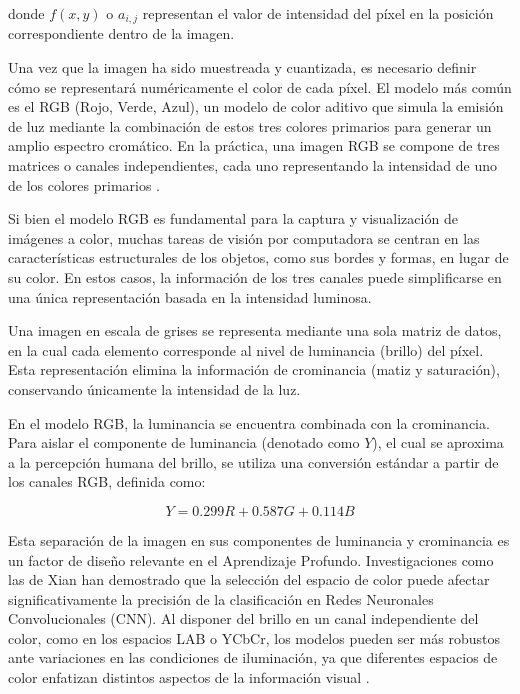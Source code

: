 	donde $f(x,y)$ o $a_{i,j}$ representan el valor de intensidad del píxel en la posición correspondiente dentro de la imagen.
	
	Una vez que la imagen ha sido muestreada y cuantizada, es necesario definir cómo se representará numéricamente el color de cada píxel. El modelo más común es el RGB (Rojo, Verde, Azul), un modelo de color aditivo que simula la emisión de luz mediante la combinación de estos tres colores primarios para generar un amplio espectro cromático. En la práctica, una imagen RGB se compone de tres matrices o canales independientes, cada uno representando la intensidad de uno de los colores primarios \cite{xian2025}.
	
	Si bien el modelo RGB es fundamental para la captura y visualización de imágenes a color, muchas tareas de visión por computadora se centran en las características estructurales de los objetos, como sus bordes y formas, en lugar de su color. En estos casos, la información de los tres canales puede simplificarse en una única representación basada en la intensidad luminosa.
	
	Una imagen en escala de grises se representa mediante una sola matriz de datos, en la cual cada elemento corresponde al nivel de luminancia (brillo) del píxel. Esta representación elimina la información de crominancia (matiz y saturación), conservando únicamente la intensidad de la luz.
	
	En el modelo RGB, la luminancia se encuentra combinada con la crominancia. Para aislar el componente de luminancia (denotado como $Y$), el cual se aproxima a la percepción humana del brillo, se utiliza una conversión estándar a partir de los canales RGB, definida como:
	
	\begin{equation*}
		Y = 0.299R + 0.587G + 0.114B
	\end{equation*}
	
	Esta separación de la imagen en sus componentes de luminancia y crominancia es un factor de diseño relevante en el Aprendizaje Profundo. Investigaciones como las de Xian \cite{xian2025} han demostrado que la selección del espacio de color puede afectar significativamente la precisión de la clasificación en Redes Neuronales Convolucionales (CNN). Al disponer del brillo en un canal independiente del color, como en los espacios LAB o YCbCr, los modelos pueden ser más robustos ante variaciones en las condiciones de iluminación, ya que diferentes espacios de color enfatizan distintos aspectos de la información visual \cite{ballester2022}.
	
